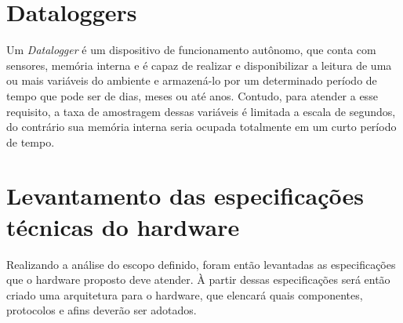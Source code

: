 \section{Dataloggers}\label{sec:datalogger}

Um \textit{Datalogger} é um dispositivo de funcionamento autônomo, que conta com sensores, memória interna e é capaz de realizar e disponibilizar a leitura de uma ou mais variáveis do ambiente e armazená-lo por um determinado período de tempo que pode ser de dias, meses ou até anos. Contudo, para atender a esse requisito, a taxa de amostragem dessas variáveis é limitada a escala de segundos, do contrário sua memória interna seria ocupada totalmente em um curto período de tempo.

\section{Levantamento das especificações técnicas do hardware}

Realizando a análise do escopo definido, foram então levantadas as especificações que o hardware proposto deve atender. À partir dessas especificações será então criado uma arquitetura para o hardware, que elencará quais componentes, protocolos e afins deverão ser adotados.


